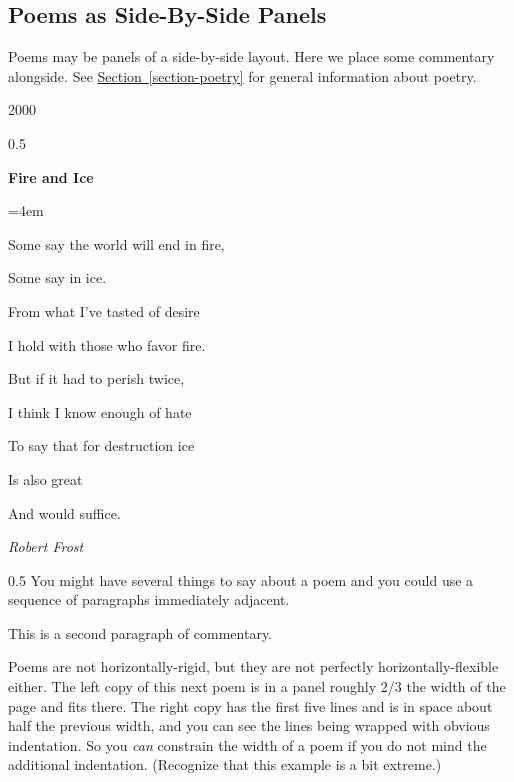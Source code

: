 \documentclass{sn-jnl}
\theoremstyle{thmstyleone}%
\theoremstyle{thmstyletwo}%
\theoremstyle{thmstylethree}%
\newcommand{\xreffont}{\relax}
\numberwithin{equation}{section}
\newenvironment{poem}{\setlength{\parindent}{0em}}{}
\newcommand{\poemTitle}[1]{\begin{center}\large\textbf{#1}\end{center}}
\newenvironment{stanza}{\vspace{0.25 em}\hangindent=4em}{\vspace{1 em}}
\newcommand{\poemauthorleft}[1]{\vspace{-1em}\begin{flushleft}\textit{#1}\end{flushleft}}
\newcommand{\poemlineleft}[1]{{\raggedright{#1}\par}\vspace{-\parskip}}
\begin{document}
\subsection{Poems as Side-By-Side Panels}\label{section-side-by-side-16}%
Poems may be panels of a side-by-side layout.  Here we place some commentary alongside.  See \hyperref[section-poetry]{Section~{\xreffont\ref{section-poetry}}} for general information about poetry.%
\begin{sidebyside}{2}{0}{0}{0}%
\begin{sbspanel}{0.5}%
\begin{poem}%
\poemTitle{Fire and Ice}
%
\begin{stanza}
\poemlineleft{Some say the world will end in fire,}
\poemlineleft{Some say in ice.}
\poemlineleft{From what I've tasted of desire}
\poemlineleft{I hold with those who favor fire.}
\poemlineleft{But if it had to perish twice,}
\poemlineleft{I think I know enough of hate}
\poemlineleft{To say that for destruction ice}
\poemlineleft{Is also great}
\poemlineleft{And would suffice.}
\end{stanza}
\poemauthorleft{Robert Frost}
\end{poem}
\end{sbspanel}%
\begin{sbspanel}{0.5}%
You might have several things to say about a poem and you could use a sequence of paragraphs immediately adjacent.%
\par
This is a second paragraph of commentary.%
\end{sbspanel}%
\end{sidebyside}%
\par
Poems are not horizontally-rigid, but they are not perfectly horizontally-flexible either.  The left copy of this next poem is in a panel roughly 2\slash{}3 the width of the page and fits there.  The right copy has the first five lines and is in space about half the previous width, and you can see the lines being wrapped with obvious indentation.  So you \emph{can} constrain the width of a poem if you do not mind the additional indentation.  (Recognize that this example is a bit extreme.)%
\end{document}
